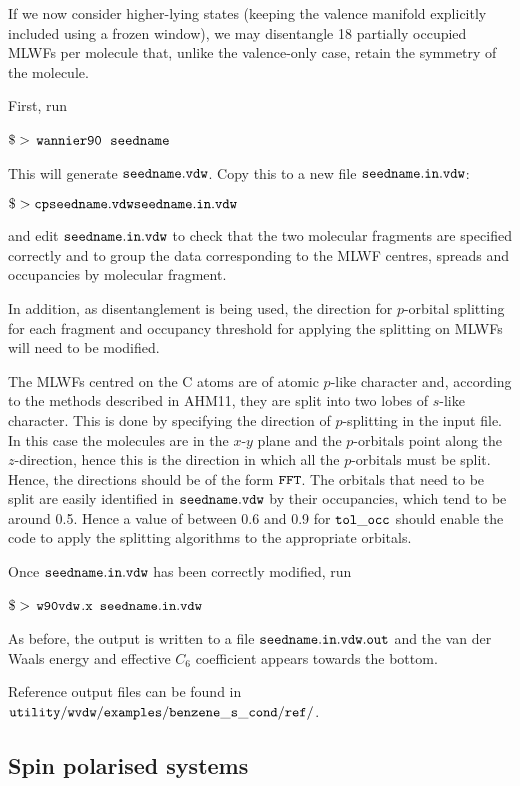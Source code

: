 \documentclass{report}
\newcommand{\wvdw}{{$\tt{w90vdw}$}}
\newcommand{\wannier}{{$\tt{wannier90}$}}
\begin{document}
If we now consider higher-lying states (keeping the valence manifold
explicitly included using a frozen window), we may disentangle 18
partially occupied MLWFs per molecule that, unlike the valence-only
case, retain the symmetry of the molecule. 

First, run 

$\tt{\$>}$ \wannier\ $\tt{seedname}$

This will generate $\tt{seedname.vdw}$. Copy this to a new file
$\tt{seedname.in.vdw}$:

$\tt{\$> cp seedname.vdw seedname.in.vdw}$

and edit $\tt{seedname.in.vdw}$ to check that the two molecular
fragments are specified correctly and to group the data corresponding
to the MLWF centres, spreads and occupancies by molecular fragment. 

In addition, as disentanglement is being used, the direction for
$p$-orbital splitting for each fragment and occupancy threshold for
applying the splitting on MLWFs will need to be modified. 

The MLWFs centred on the C atoms are of atomic $p$-like character and, 
according to the methods described in AHM11, they are split into two
lobes of $s$-like character. This is done by specifying the direction
of $p$-splitting in the input file. In this case the molecules are in
the $x$-$y$ plane and the $p$-orbitals point along the $z$-direction,
hence this is the direction in which all the $p$-orbitals must be
split. Hence, the directions should be of the form $\tt{F F T}$. The
orbitals that need to be split are easily identified in
$\tt{seedname.vdw}$ by their occupancies, which tend to be around
0.5. Hence a value of between 0.6 and 0.9 for $\tt{tol\_occ}$ should
enable the code to apply the splitting algorithms to the appropriate
orbitals. 

Once $\tt{seedname.in.vdw}$ has been correctly modified, run

$\tt{\$>}$ \wvdw$\tt{.x}$ $\tt{seedname.in.vdw}$

As before, the output is written to a file $\tt{seedname.in.vdw.out}$ 
and the van der Waals energy and effective $C_6$ coefficient appears 
towards the bottom.

Reference output files can be found in  
$\tt{utility/wvdw/examples/benzene\_s\_cond/ref/}$.


\subsection{Spin polarised systems} 
\end{document}
